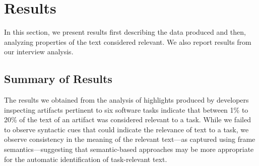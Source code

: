 
\section{Results}
\label{cp3:results}


In this section, we present results first describing the data produced
and 
then, analyzing properties of the text considered relevant. 
We also report results from our interview analysis.










\subsection{Summary of Results}


The results we obtained 
from the analysis of highlights produced by 
developers inspecting artifacts 
pertinent to six software tasks indicate that
between 1\% to 20\% of the text of an artifact was considered
relevant to a task.
While we failed to observe syntactic cues 
that could indicate the relevance of text to a task, 
we observe consistency in the meaning of the relevant text---as captured using frame semantics---suggesting that semantic-based approaches 
may be more appropriate for the 
automatic identification of task-relevant text.









